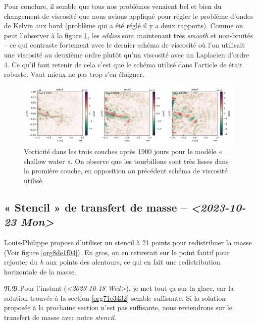 \documentclass[10pt]{report}
\numberwithin{equation}{section}
\newcommand{\pt}{\hspace{1pt}} %
\newcommand{\nb}{\underline{{\footnotesize\EightStarConvex}\pt $\mathfrak{N.B.}$\vphantom{p}}\hspace{3pt}}
\begin{document}
Pour conclure, il semble que tous nos problèmes venaient bel et bien du changement de viscosité que nous avions appliqué pour régler le problème d'ondes de Kelvin aux bord (problème qui a été réglé \href{rapport-2023-10-06.pdf}{il y a deux rapports}).
Comme on peut l'observer à la figure \ref{fig:org2fe6b1f}, les \emph{eddies} sont maintenant très \emph{smooth} et non-bruités -- ce qui contraste fortement avec le dernier schéma de viscosité où l'on utilisait une viscosité au deuxième ordre plutôt qu'un viscosité avec un Laplacien d'ordre 4.
Ce qu'il faut retenir de cela c'est que le schéma utilisé dans l'article de \Textcite{chen_2021} était robuste.
Vaut mieux ne pas trop s'en éloigner. 

\begin{figure}[htbp]
\centering
\includegraphics[width=.9\linewidth]{figures/debuggage/2023_10_17_smooth_zeta.png}
\caption{\label{fig:org2fe6b1f}Vorticité dans les trois couches après 1900 jours pour le modèle « shallow water ». On observe que les tourbillons sont très lisses dans la promière couche, en opposition au précédent schéma de viscosité utilisé.}
\end{figure}


\subsection{« Stencil » de transfert de masse -- \textit{<2023-10-23 Mon>}}
\label{sec:org9dc0cf7}
\label{orga811b83}

Louis-Philippe propose d'utiliser un stencil à 21 points pour redistribuer la masse (Voir figure \ref{org8de1f04}).
En gros, on en retirerait sur le point fautif pour rejouter du \emph{h} aux points des alentours, ce qui en fait une redistribution horizontale de la masse.\bigskip

\nb Pour l'instant (\textit{<2023-10-18 Wed>}), je met tout ça sur la glace, car la solution trouvée à la section \ref{org71e3432} semble suffisante.
Si la solution proposée à la prochaine section n'est pas suffisante, nous reviendrons sur le transfert de masse avec notre \emph{stencil}. 
\end{document}

